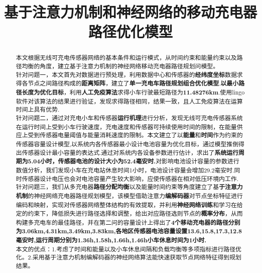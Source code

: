 \documentclass{whutmod}
\title{基于注意力机制和神经网络的移动充电器路径优化模型}
\begin{document}
\maketitle
\begin{abstract}
本文根据无线可充电传感器网络的基本条件和运行模式，从时间约束和能量约束以及路径均衡的角度，建立基于注意力机制的神经网络移动充电器路径规划问模型。
~\\

针对问题一，本文首先对数据进行预处理，利用数据中心和传感器的\textbf{经纬度坐标}数据求得各节点之间路径构成的\textbf{距离矩阵}，建立了\textbf{单一充电车路径规划组合优化模型}.\textbf{以最小路径长度为优化目标}，利用\textbf{人工免疫算法}求得小车行驶最短路径为\textbf{11.48276km}.使用lingo软件对该算法的结果进行验证，发现求得路径相同，结果一致，且人工免疫算法在运算时间上具有优势.
~\\

针对问题二，通过对充电小车和传感器\textbf{运行机理}进行分析，发现无线可充电传感器系统在运行时间上受到小车行驶速度，充电速度和传感器可持续使用时间的限制，在能量供应上受到传感器电量阈值与能量消耗速度的限制。本文建立了以\textbf{能量}和\textbf{时间}作为约束的传感器容量设计模型,以系统内各传感器最小设计电池容量为优化目标，通过模型推倒得出传感器设计最小容量的表达式.通过对系统内各设备参数进行估计，求出了\textbf{系统运行周期为5.04小时，传感器电池的设计大小为52.4毫安时.}对影响电池设计容量的参数进行数值分析，我们发现小车在充电站休息时间1小时，电池设计容量会增加29.2毫安时.同时传感器设计电压也会对电池容量产生较大影响，应使传感器在相对低压环境内工作.
~\\

针对问题三，我们从多充电器\textbf{路径分配均衡}以及能量时间约束等角度建立了基\textbf{于注意力机制}的神经网络充电器路径规划模型，该模型借助注意力\textbf{编解码器}对节点坐标特征进行编码和映射，实现对传感器网络整体结构的有效提取，并利用\textbf{神经网络训练}和学习在给定的约束下，降低损失进行路径选择和调整，给出对应路径选则节点的\textbf{概率分布}，从而构建多充电车的最佳路径，并在第二问的容量设计上得出了\textbf{4个移动充电器的路径分别为3.06km,4.31km,3.49km,3.83km,各地区传感器电池容量设置13.6,15.8,17.3,12.8毫安时,运行周期分别为1.36h,1.58h,1.66h,1.46h小车休息时间为1小时.}
~\\

本文的优点：1.考虑了时间和能量以及小车休息间隔和负载均衡等多项指标进行路径优化。2.采用基于注意力机制编解码器的神经网络算法能快速获取节点网络特征得到规划结果。


\end{abstract}
\end{document}
